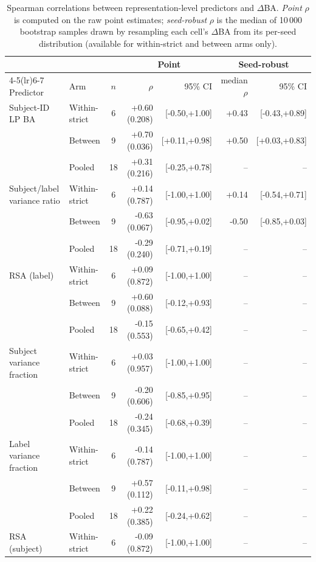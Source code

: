 \begin{table}[t]
\centering
\caption{Spearman correlations between representation-level predictors and $\Delta$BA. \emph{Point} $\rho$ is computed on the raw point estimates; \emph{seed-robust} $\rho$ is the median of 10\,000 bootstrap samples drawn by resampling each cell's $\Delta$BA from its per-seed distribution (available for within-strict and between arms only).}
\label{tab:correlations}
\begin{tabular}{llcrrrr}
\toprule
 & & & \multicolumn{2}{c}{Point} & \multicolumn{2}{c}{Seed-robust} \\
\cmidrule(lr){4-5}\cmidrule(lr){6-7}
Predictor & Arm & $n$ & $\rho$ & 95\% CI & median $\rho$ & 95\% CI \\
\midrule
Subject-ID LP BA & Within-strict & 6 & +0.60 (0.208) & [-0.50,+1.00] & +0.43 & [-0.43,+0.89] \\
 & Between & 9 & +0.70 (0.036) & [+0.11,+0.98] & +0.50 & [+0.03,+0.83] \\
 & Pooled & 18 & +0.31 (0.216) & [-0.25,+0.78] & -- & -- \\
\addlinespace
Subject/label variance ratio & Within-strict & 6 & +0.14 (0.787) & [-1.00,+1.00] & +0.14 & [-0.54,+0.71] \\
 & Between & 9 & -0.63 (0.067) & [-0.95,+0.02] & -0.50 & [-0.85,+0.03] \\
 & Pooled & 18 & -0.29 (0.240) & [-0.71,+0.19] & -- & -- \\
\addlinespace
RSA (label) & Within-strict & 6 & +0.09 (0.872) & [-1.00,+1.00] & -- & -- \\
 & Between & 9 & +0.60 (0.088) & [-0.12,+0.93] & -- & -- \\
 & Pooled & 18 & -0.15 (0.553) & [-0.65,+0.42] & -- & -- \\
\addlinespace
Subject variance fraction & Within-strict & 6 & +0.03 (0.957) & [-1.00,+1.00] & -- & -- \\
 & Between & 9 & -0.20 (0.606) & [-0.85,+0.95] & -- & -- \\
 & Pooled & 18 & -0.24 (0.345) & [-0.68,+0.39] & -- & -- \\
\addlinespace
Label variance fraction & Within-strict & 6 & -0.14 (0.787) & [-1.00,+1.00] & -- & -- \\
 & Between & 9 & +0.57 (0.112) & [-0.11,+0.98] & -- & -- \\
 & Pooled & 18 & +0.22 (0.385) & [-0.24,+0.62] & -- & -- \\
\addlinespace
RSA (subject) & Within-strict & 6 & -0.09 (0.872) & [-1.00,+1.00] & -- & -- \\

\end{tabular}
\end{table}
